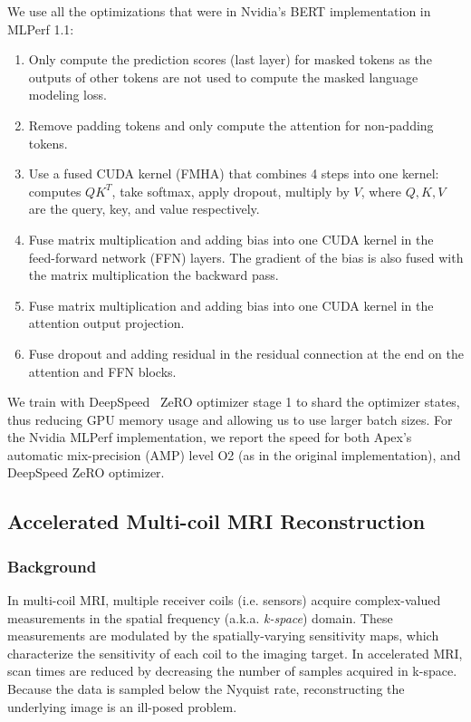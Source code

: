 We use all the optimizations that were in Nvidia's BERT implementation
in MLPerf 1.1:
\begin{enumerate}
  \item Only compute the prediction scores (last layer) for masked tokens as
  the outputs of other tokens are not used to compute the masked language
  modeling loss.
  \item Remove padding tokens and only compute the attention for non-padding
  tokens.
  \item Use a fused CUDA kernel (FMHA) that combines 4 steps into one kernel: computes
  $Q K^T$, take softmax, apply dropout, multiply by $V$, where $Q, K, V$ are the
  query, key, and value respectively.
  \item Fuse matrix multiplication and adding bias into one CUDA kernel in the feed-forward network
  (FFN) layers. The gradient of the bias is also fused with the matrix
  multiplication the backward pass.
  \item Fuse matrix multiplication and adding bias into one CUDA kernel in the
  attention output projection.
  \item Fuse dropout and adding residual in the residual connection at the end
  on the attention and FFN blocks.
\end{enumerate}

We train with DeepSpeed~\citep{rasley2020deepspeed} ZeRO optimizer stage 1 to
shard the optimizer states, thus reducing GPU memory usage and allowing us to
use larger batch sizes.
For the Nvidia MLPerf implementation, we report the speed for both Apex's
automatic mix-precision (AMP) level O2 (as in the original implementation), and
DeepSpeed ZeRO optimizer.

\subsection{Accelerated Multi-coil MRI Reconstruction}
\label{sec:experiment_details_mri}

\subsubsection{Background}
In multi-coil MRI, multiple receiver coils (i.e. sensors) acquire complex-valued measurements in the spatial frequency (a.k.a. \textit{k-space}) domain. These measurements are modulated by the spatially-varying sensitivity maps, which characterize the sensitivity of each coil to the imaging target. In accelerated MRI, scan times are reduced by decreasing the number of samples acquired in k-space. Because the data is sampled below the Nyquist rate, reconstructing the underlying image is an ill-posed problem.

